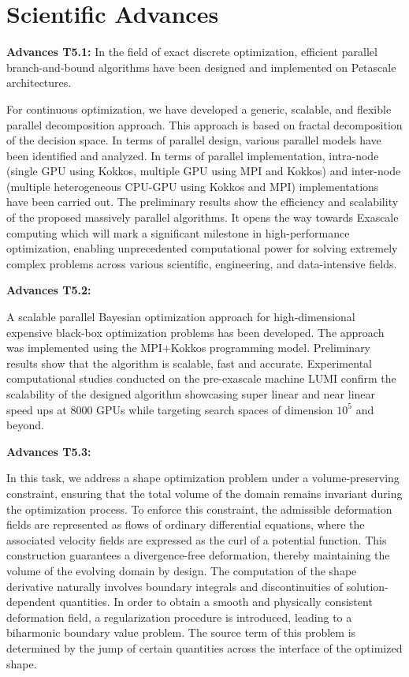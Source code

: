 \section{Scientific Advances}
  
{\bf Advances T5.1:}
In the field of exact discrete optimization, efficient parallel branch-and-bound algorithms have been designed and implemented on Petascale architectures. 

\medskip

For continuous optimization, we have developed a generic, scalable, and flexible parallel decomposition approach. This approach is based on fractal decomposition of the decision space. In terms of parallel design, various parallel models have been identified and analyzed. In terms of parallel implementation, intra-node (single GPU using Kokkos, multiple GPU using MPI and Kokkos) and inter-node (multiple heterogeneous CPU-GPU using Kokkos and MPI) implementations have been carried out. The preliminary results show the efficiency and scalability of the proposed massively parallel algorithms. It opens the way towards Exascale computing which will mark a significant milestone in high-performance optimization, enabling unprecedented computational power for solving extremely complex problems across various scientific, engineering, and data-intensive fields.

\medskip

{\bf Advances T5.2:} 

A scalable parallel Bayesian optimization approach for high-dimensional expensive black-box optimization problems has been developed. The approach was implemented using the MPI+Kokkos programming model. Preliminary results show that the algorithm is scalable, fast and  accurate. Experimental computational studies conducted on the pre-exascale machine LUMI  confirm the scalability of the designed algorithm showcasing super linear and near linear speed ups at 8000 GPUs while targeting search spaces of dimension $10^5$ and beyond.

\medskip

{\bf Advances T5.3:}

In this task, we address a shape optimization problem under a volume-preserving constraint, ensuring that the total volume of the domain remains invariant during the optimization process. To enforce this constraint, the admissible deformation fields are represented as flows of ordinary differential equations, where the associated velocity fields are expressed as the curl of a potential function. This construction guarantees a divergence-free deformation, thereby maintaining the volume of the evolving domain by design. The computation of the shape derivative naturally involves boundary integrals and discontinuities of solution-dependent quantities. In order to obtain a smooth and physically consistent deformation field, a regularization procedure is introduced, leading to a biharmonic boundary value problem. The source term of this problem is determined by the jump of certain quantities across the interface of the optimized shape.

